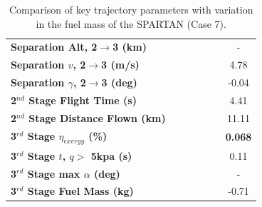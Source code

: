 \begin{table}[!ht]
\begin{tabular}{l c c c c c c}
	\textbf{Separation Alt, 2$\rightarrow$3 (km)}
	& \secondthirdSeparationAltmFuelNinetyNoReturn
	& \secondthirdSeparationAltmFuelNinetyFiveNoReturn
	& \secondthirdSeparationAltmFuelStandardNoReturn
	& \secondthirdSeparationAltmFuelOneHundredFiveNoReturn
	& \secondthirdSeparationAltmFuelOneHundredTenNoReturn
	& -
	\\
	\textbf{Separation $v$, 2$\rightarrow$3 (m/s)}
	& \secondthirdSeparationvmFuelNinetyNoReturn
	& \secondthirdSeparationvmFuelNinetyFiveNoReturn
	& \secondthirdSeparationvmFuelStandardNoReturn
	& \secondthirdSeparationvmFuelOneHundredFiveNoReturn
	& \secondthirdSeparationvmFuelOneHundredTenNoReturn
	&4.78
	\\
	\textbf{Separation $\gamma$, 2$\rightarrow$3 (deg)}
	& \secondthirdSeparationgammamFuelNinetyNoReturn
	& \secondthirdSeparationgammamFuelNinetyFiveNoReturn
	& \secondthirdSeparationgammamFuelStandardNoReturn
	& \secondthirdSeparationgammamFuelOneHundredFiveNoReturn
	& \secondthirdSeparationgammamFuelOneHundredTenNoReturn
	&-0.04
	\\
	\textbf{2$^{nd}$ Stage Flight Time (s)}
	& \secondFlightTimemFuelNinetyNoReturn
	& \secondFlightTimemFuelNinetyFiveNoReturn
	& \secondFlightTimemFuelStandardNoReturn
	& \secondFlightTimemFuelOneHundredFiveNoReturn
	& \secondFlightTimemFuelOneHundredTenNoReturn
	&4.41
	\\
	\textbf{2$^{nd}$ Stage Distance Flown (km)}
	& \SecondDistmFuelNinetyNoReturn
	& \SecondDistmFuelNinetyFiveNoReturn
	& \SecondDistmFuelStandardNoReturn
	& \SecondDistmFuelOneHundredFiveNoReturn
	& \SecondDistmFuelOneHundredTenNoReturn
	&11.11
	\\
	\hline 
	\textbf{3$^{rd}$ Stage $\eta_{exergy}$ (\%)}
	& \textbf{\thirddExergyEffmFuelNinetyNoReturn}
	& \textbf{\thirddExergyEffmFuelNinetyFiveNoReturn}
	& \textbf{\thirddExergyEffmFuelStandardNoReturn}
	& \textbf{\thirddExergyEffmFuelOneHundredFiveNoReturn}
	& \textbf{\thirddExergyEffmFuelOneHundredTenNoReturn}
	& \textbf{0.068}
	\\

	\textbf{3$^{rd}$ Stage $t$, $q >$ 5kpa (s)}
	& \thirdqOverFivemFuelNinetyNoReturn
	& \thirdqOverFivemFuelNinetyFiveNoReturn
	& \thirdqOverFivemFuelStandardNoReturn
	& \thirdqOverFivemFuelOneHundredFiveNoReturn
	& \thirdqOverFivemFuelOneHundredTenNoReturn
	&0.11
	\\
	\textbf{3$^{rd}$ Stage max $\alpha$ (deg)}
	& \thirdmaxAoAmFuelNinetyNoReturn
	& \thirdmaxAoAmFuelNinetyFiveNoReturn
	& \thirdmaxAoAmFuelStandardNoReturn
	& \thirdmaxAoAmFuelOneHundredFiveNoReturn
	& \thirdmaxAoAmFuelOneHundredTenNoReturn
	& -
	\\
	\textbf{3$^{rd}$ Stage Fuel Mass (kg)}
	& \thirdmFuelmFuelNinetyNoReturn
	& \thirdmFuelmFuelNinetyFiveNoReturn
	& \thirdmFuelmFuelStandardNoReturn
	& \thirdmFuelmFuelOneHundredFiveNoReturn
	& \thirdmFuelmFuelOneHundredTenNoReturn
	&-0.71
	\\
	\hline 
\end{tabular} 

\caption{Comparison of key trajectory parameters with variation in the fuel mass of the SPARTAN (Case 7).}
\label{tab:comparison110}
\end{table}

